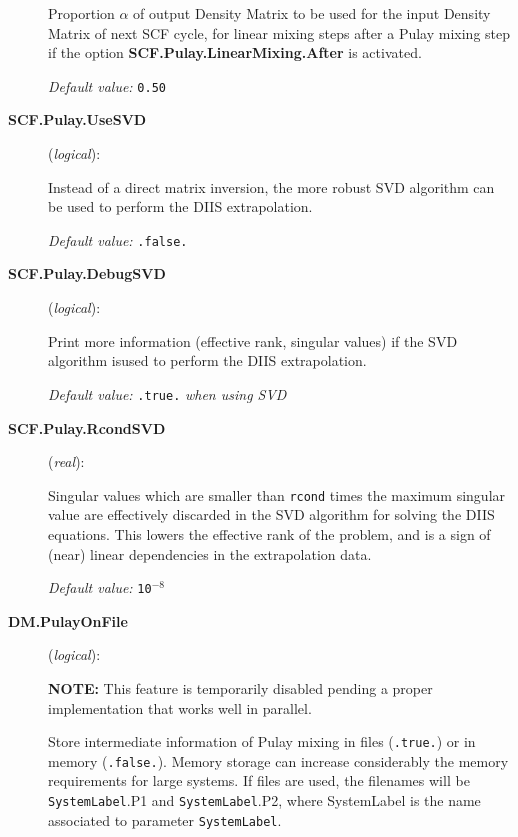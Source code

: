 \begin{description}
Proportion $\alpha$ of output Density Matrix to be used for the input
Density Matrix of next SCF cycle, for linear mixing
steps after a Pulay mixing step if the option \textbf{SCF.Pulay.LinearMixing.After} is activated.

\textit{Default value:} \texttt{0.50}

\item[\textbf{SCF.Pulay.UseSVD}] (\textit{logical}):

Instead of a direct matrix inversion, the more robust SVD algorithm can
be used to perform the DIIS extrapolation.

\textit{Default value:} \texttt{.false.}

\item[\textbf{SCF.Pulay.DebugSVD}] (\textit{logical}):

Print more information (effective rank, singular values) if the SVD algorithm
isused to perform the DIIS extrapolation.

\textit{Default value:} {\texttt{.true.} \textit{when using SVD}}

\item[\textbf{SCF.Pulay.RcondSVD}] (\textit{real}):

Singular values which are smaller than \texttt{rcond} times the maximum
singular value are effectively discarded in the SVD algorithm for
solving the DIIS equations. This lowers the effective rank of the
problem, and is a sign of (near) linear dependencies in the
extrapolation data.

\textit{Default value:} \texttt{10$^{-8}$}


\item[\textbf{DM.PulayOnFile}] (\textit{logical}):

\textbf{NOTE:} This feature is temporarily disabled pending a proper
implementation that works well in parallel.

Store intermediate information of Pulay mixing in files
(\texttt{.true.}) or in memory (\texttt{.false.}).
Memory storage can increase considerably the
memory requirements for large systems.
If files are used, the filenames will be
\texttt{SystemLabel}.P1 and
\texttt{SystemLabel}.P2,
where SystemLabel is the name associated
to parameter \texttt{SystemLabel}.


\end{description}
